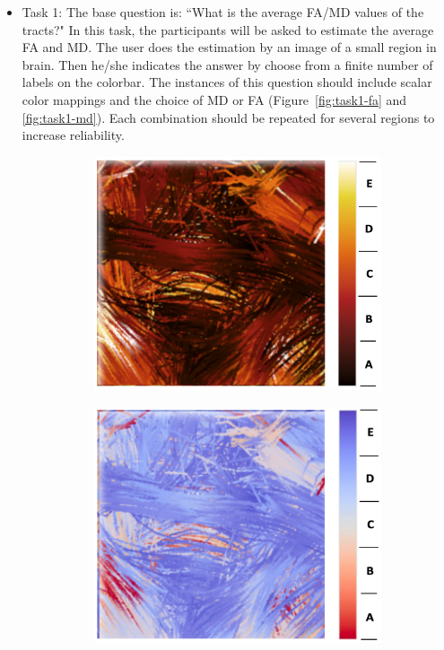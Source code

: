 \documentclass[hyperref, plainreport, noproblem]{cgvpub1}
\begin{document}
\begin{itemize}
	\item{Task 1:} The base question is: ``What is the average FA/MD values of the tracts?"
	In this task, the participants will be asked to estimate the average FA and MD. The user does the estimation by an image of a small region in brain. Then he/she indicates the answer by choose from a finite number of labels on the colorbar. The instances of this question should include scalar color mappings and the choice of MD or FA (Figure~\ref{fig:task1-fa} and \ref{fig:task1-md}). Each combination should be repeated for several regions to increase reliability. 
     	
\begin{figure}[ht]
    \centering
    \begin{subfigure}[b]{0.45\textwidth}
    	\includegraphics[width =  \columnwidth]{blackbody-fa}
	\caption{ }
    \end{subfigure}
    \hspace{0.3cm}
    \begin{subfigure}[b]{0.45\textwidth}
    	\includegraphics[width =  \columnwidth]{coolwarm-fa}

\end{subfigure}
\end{figure}
\end{itemize}
\end{document}
